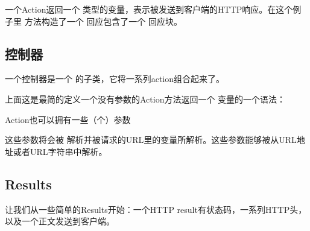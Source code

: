 \documentclass[letterpaper,10pt,english]{sphinxmanual}
\begin{document}
一个Action返回一个  类型的变量，表示被发送到客户端的HTTP响应。在这个例子里  方法构造了一个  回应包含了一个  回应块。


\subsection{控制器}
\label{\detokenize{index:id14}}
一个控制器是一个  的子类，它将一系列action组合起来了。

\begin{sphinxVerbatim}[commandchars=\\\{\}]
 

 
 

     

     
       

\end{sphinxVerbatim}

上面这是最简的定义一个没有参数的Action方法返回一个  变量的一个语法：

Action也可以拥有一些（个）参数

\begin{sphinxVerbatim}[commandchars=\\\{\}]
    
     
\end{sphinxVerbatim}

这些参数将会被  解析并被请求的URL里的变量所解析。这些参数能够被从URL地址或者URL字符串中解析。


\subsection{Results}
\label{\detokenize{index:results}}
让我们从一些简单的Results开始：一个HTTP result有状态码，一系列HTTP头，以及一个正文发送到客户端。
\end{document}

